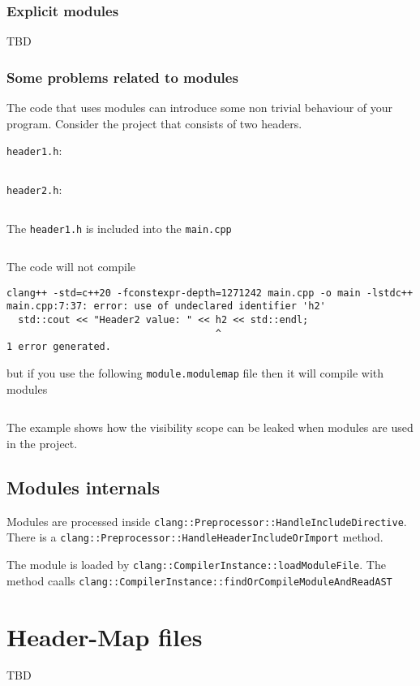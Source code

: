 \subsubsection{Explicit modules}
TBD

\subsubsection{Some problems related to modules}
The code that uses modules can introduce some non trivial behaviour of
your program. Consider the project that consists of two headers.

\texttt{header1.h}:
\inputminted{c++}{./src/pcm/nontrivial/header1.h}

\texttt{header2.h}:
\inputminted{c++}{./src/pcm/nontrivial/header2.h}

The \texttt{header1.h} is included into the
\texttt{main.cpp}
\inputminted{c++}{./src/pcm/nontrivial/main.cpp}

The code will not compile

\begin{verbatim}
clang++ -std=c++20 -fconstexpr-depth=1271242 main.cpp -o main -lstdc++
main.cpp:7:37: error: use of undeclared identifier 'h2'
  std::cout << "Header2 value: " << h2 << std::endl;
                                    ^
1 error generated.
\end{verbatim}
but if you use the following \texttt{module.modulemap} file
then it will compile with modules
\inputminted{text}{./src/pcm/nontrivial/module.modulemap}
The example shows how the visibility scope can be leaked when
modules are used in the project. 

\subsection{Modules internals}
Modules are processed inside
\texttt{clang::Preprocessor::HandleIncludeDirective}. There
is a \texttt{clang::Preprocessor::HandleHeaderIncludeOrImport} method. 

The module is loaded by
\texttt{clang::CompilerInstance::loadModuleFile}. The method caalls
 \texttt{clang::CompilerInstance::findOrCompileModuleAndReadAST}

% 

\section{Header-Map files}
TBD
